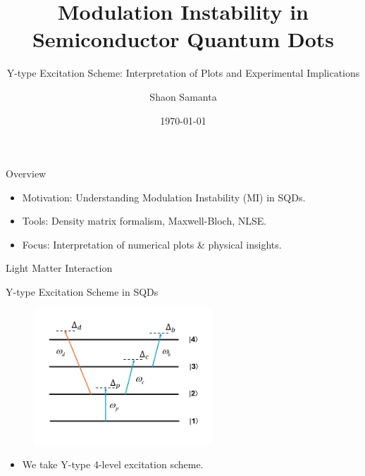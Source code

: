 \documentclass{beamer}
\title{Modulation Instability in Semiconductor Quantum Dots}
\subtitle{Y-type Excitation Scheme: Interpretation of Plots and Experimental Implications}
\author{Shaon Samanta}
\institute{Department of Physics}
\date{\today}
\begin{document}
\frame{\titlepage}

\begin{frame}{Overview}
  \vspace{-3pt}
  \begin{itemize}
    \item Motivation: Understanding Modulation Instability (MI) in SQDs.
    \item Tools: Density matrix formalism, Maxwell-Bloch, NLSE\@.
    \item Focus: Interpretation of numerical plots \& physical insights.
  \end{itemize}
\end{frame}

\begin{frame}{Light Matter Interaction}
  
\end{frame}

\begin{frame}{Y-type Excitation Scheme in SQDs}
  \vspace{-30pt}
  \begin{figure}
    \includegraphics[width=0.6\textwidth]{Assets/Y-type.png}
  \end{figure}
  \vspace{-12pt}
  \begin{itemize}
    \item We take Y-type 4-level excitation scheme.
  \end{itemize}
\end{frame}
\end{document}
